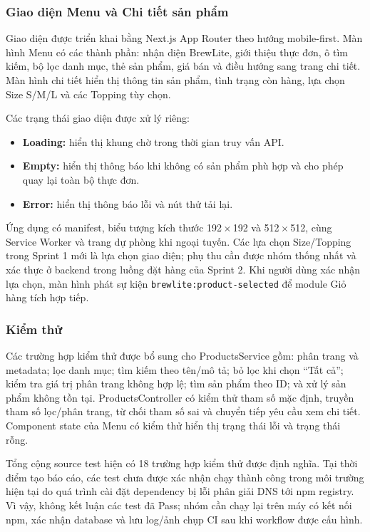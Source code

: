 \subsubsection{Giao diện Menu và Chi tiết sản phẩm}

Giao diện được triển khai bằng Next.js App Router theo hướng mobile-first. Màn hình Menu có các thành phần: nhận diện BrewLite, giới thiệu thực đơn, ô tìm kiếm, bộ lọc danh mục, thẻ sản phẩm, giá bán và điều hướng sang trang chi tiết. Màn hình chi tiết hiển thị thông tin sản phẩm, tình trạng còn hàng, lựa chọn Size S/M/L và các Topping tùy chọn.

Các trạng thái giao diện được xử lý riêng:
\begin{itemize}
    \item \textbf{Loading:} hiển thị khung chờ trong thời gian truy vấn API.
    \item \textbf{Empty:} hiển thị thông báo khi không có sản phẩm phù hợp và cho phép quay lại toàn bộ thực đơn.
    \item \textbf{Error:} hiển thị thông báo lỗi và nút thử tải lại.
\end{itemize}

Ứng dụng có manifest, biểu tượng kích thước 192\,$\times$\,192 và 512\,$\times$\,512, cùng Service Worker và trang dự phòng khi ngoại tuyến. Các lựa chọn Size/Topping trong Sprint 1 mới là lựa chọn giao diện; phụ thu cần được nhóm thống nhất và xác thực ở backend trong luồng đặt hàng của Sprint 2. Khi người dùng xác nhận lựa chọn, màn hình phát sự kiện \texttt{brewlite:product-selected} để module Giỏ hàng tích hợp tiếp.

\subsubsection{Kiểm thử}

Các trường hợp kiểm thử được bổ sung cho ProductsService gồm: phân trang và metadata; lọc danh mục; tìm kiếm theo tên/mô tả; bỏ lọc khi chọn “Tất cả”; kiểm tra giá trị phân trang không hợp lệ; tìm sản phẩm theo ID; và xử lý sản phẩm không tồn tại. ProductsController có kiểm thử tham số mặc định, truyền tham số lọc/phân trang, từ chối tham số sai và chuyển tiếp yêu cầu xem chi tiết. Component state của Menu có kiểm thử hiển thị trạng thái lỗi và trạng thái rỗng.

Tổng cộng source test hiện có 18 trường hợp kiểm thử được định nghĩa. Tại thời điểm tạo báo cáo, các test chưa được xác nhận chạy thành công trong môi trường hiện tại do quá trình cài đặt dependency bị lỗi phân giải DNS tới npm registry. Vì vậy, không kết luận các test đã Pass; nhóm cần chạy lại trên máy có kết nối npm, xác nhận database và lưu log/ảnh chụp CI sau khi workflow được cấu hình.

